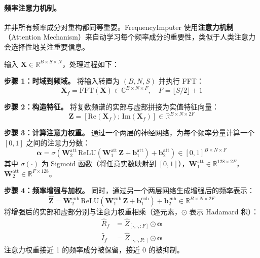 \documentclass[UTF8]{ctexart}
\begin{document}
\paragraph{频率注意力机制。}

并非所有频率成分对重构都同等重要。FrequencyImputer 使用\textbf{注意力机制}（Attention Mechanism）来自动学习每个频率成分的重要性，类似于人类注意力会选择性地关注重要信息。

输入 $\mathbf{X} \in \mathbb{R}^{B \times S \times N}$，处理过程如下：

\textbf{步骤 1：时域到频域。} 将输入转置为 $(B, N, S)$ 并执行 FFT：
\begin{equation}
    \mathbf{X}_f = \mathrm{FFT}(\mathbf{X}) \in \mathbb{C}^{B \times N \times F}, \quad F = \lfloor S/2 \rfloor + 1
\end{equation}

\textbf{步骤 2：构造特征。} 将复数频谱的实部与虚部拼接为实值特征向量：
\begin{equation}
    \mathbf{Z} = [\mathrm{Re}(\mathbf{X}_f); \, \mathrm{Im}(\mathbf{X}_f)] \in \mathbb{R}^{B \times N \times 2F}
\end{equation}

\textbf{步骤 3：计算注意力权重。} 通过一个两层的神经网络，为每个频率分量计算一个 $[0,1]$ 之间的注意力分数：
\begin{equation}
    \boldsymbol{\alpha} = \sigma\!\left(\mathbf{W}_2^{\text{att}} \, \mathrm{ReLU}\!\left(\mathbf{W}_1^{\text{att}} \, \mathbf{Z} + \mathbf{b}_1^{\text{att}}\right) + \mathbf{b}_2^{\text{att}}\right) \in [0,1]^{B \times N \times F}
\end{equation}
其中 $\sigma(\cdot)$ 为 Sigmoid 函数（将任意实数映射到 $[0,1]$），$\mathbf{W}_1^{\text{att}} \in \mathbb{R}^{128 \times 2F}$，$\mathbf{W}_2^{\text{att}} \in \mathbb{R}^{F \times 128}$。

\textbf{步骤 4：频率增强与加权。} 同时，通过另一个两层网络生成增强后的频率表示：
\begin{equation}
    \hat{\mathbf{Z}} = \mathbf{W}_2^{\text{enh}} \, \mathrm{ReLU}\!\left(\mathbf{W}_1^{\text{enh}} \, \mathbf{Z} + \mathbf{b}_1^{\text{enh}}\right) + \mathbf{b}_2^{\text{enh}} \in \mathbb{R}^{B \times N \times 2F}
\end{equation}
将增强后的实部和虚部分别与注意力权重相乘（逐元素，$\odot$ 表示 Hadamard 积）：
\begin{align}
    \hat{R}_f &= \hat{Z}_{[\cdot, \cdot, :F]} \odot \boldsymbol{\alpha} \\
    \hat{I}_f &= \hat{Z}_{[\cdot, \cdot, F:]} \odot \boldsymbol{\alpha}
\end{align}
注意力权重接近 1 的频率成分被保留，接近 0 的被抑制。
\end{document}
